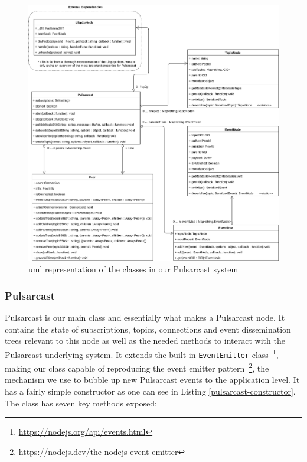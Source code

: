 \begin{figure}[hb!]
  \center
  \includegraphics[width=1\textwidth]{img/uml-pulsarcast.png}
  \caption{\acrshort{uml} representation of the classes in our Pulsarcast system}
  \label{fig:pulsarcast-uml}
\end{figure}

\subsubsection{Pulsarcast}\label{subsubsec:pulsarcast}

Pulsarcast is our main class and essentially what makes a Pulsarcast node. It
contains the state of subscriptions, topics, connections and event
dissemination trees relevant to this node as well as the needed methods to
interact with the Pulsarcast underlying system. It extends the built-in
\verb|EventEmitter| class~\footnote{\url{https://nodejs.org/api/events.html}},
making our class capable of reproducing the event emitter
pattern~\footnote{\url{https://nodejs.dev/the-nodejs-event-emitter}}, the
mechanism we use to bubble up new Pulsarcast events to the application level.
It has a fairly simple constructor as one can see in Listing
\ref{pulsarcast-constructor}. The class has seven key methods exposed:

